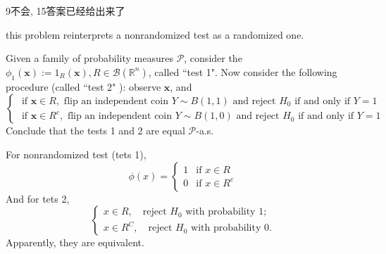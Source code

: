 \chapter{}
9不会, 15答案已经给出来了
\begin{ex}
     this problem reinterprets a nonrandomized test as a randomized one. 

    Given a family of probability measures 
    \(\mathcal{P}\), consider the \(\phi_{1}(\mathbf{x}):=1_{R}(\mathbf{x}), R \in \mathcal{B}\left(\mathbb{R}^{n}\right)\), called ``test 1". Now consider the following procedure (called ``test 2" ): observe \(\mathbf{x}\), and
    \[\left\{\begin{array}{l}\text { if } \mathbf{x} \in R, \text { flip an independent coin } Y \sim B(1,1) \text { and reject } H_{0} \text { if and only if } Y=1 \\ \text { if } \mathbf{x} \in R^{c}, \text { flip an independent coin } Y \sim B(1,0) \text { and reject } H_{0} \text { if and only if } Y=1\end{array}\right.\]
    Conclude that the tests 1 and 2 are equal \(\mathcal{P}\)-a.s. 
\end{ex}

\begin{solution}
    For nonrandomized test (tets 1), 
    \[
        \phi(x)=\left\{\begin{matrix}
            1 & \text{if } x \in R \\
            0 & \text{if } x \in R^{c}
        \end{matrix}\right.
    \]
    And for tets 2, 
    \[
        \left\{\begin{matrix}
            x\in R, \quad\text{reject } H_0 \text{ with probability } 1; \\
            x\in R^C, \quad\text{reject } H_0 \text{ with probability } 0. 
        \end{matrix}\right. 
    \]
    Apparently, they are equivalent. 
\end{solution}

